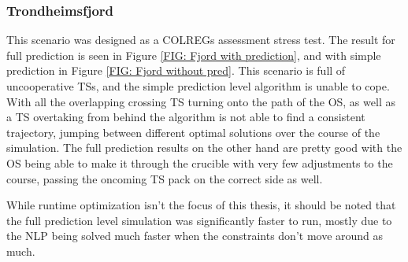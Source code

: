 \subsubsection{Trondheimsfjord}

This scenario was designed as a COLREGs assessment stress test. The result for full prediction is seen in Figure \ref{FIG: Fjord with prediction}, and
with simple prediction in Figure \ref{FIG: Fjord without pred}. This scenario is full of uncooperative TSs, and the simple prediction level
algorithm is unable to cope. With all the overlapping crossing TS turning onto the path of the OS, as well as a TS overtaking from behind the algorithm
is not able to find a consistent trajectory, jumping between different optimal solutions over the course of the simulation.
The full prediction results on the other hand are pretty good with the OS being able to make it through the crucible with
very few adjustments to the course, passing the oncoming TS pack on the correct side as well.

While runtime optimization isn't the focus of this thesis, it should be noted that the full prediction level simulation was significantly
faster to run, mostly due to the \gls{NLP} being solved much faster when the constraints don't move around as much.


